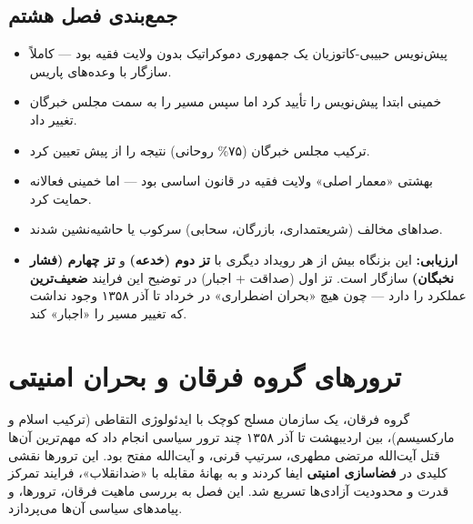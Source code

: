 \documentclass[12pt,a4paper]{book}
\newcommand{\keyword}[1]{\textbf{\textcolor{cPrimary}{#1}}}
\begin{document}
\section{جمع‌بندی فصل هشتم}

\begin{principleBox}
\begin{itemize}[label=\textcolor{cPrimary}{$\blacksquare$}, rightmargin=2em]
    \item پیش‌نویس حبیبی-کاتوزیان یک جمهوری دموکراتیک بدون ولایت فقیه بود — کاملاً سازگار با وعده‌های پاریس.
    \item خمینی ابتدا پیش‌نویس را تأیید کرد اما سپس مسیر را به سمت مجلس خبرگان تغییر داد.
    \item ترکیب مجلس خبرگان (۷۵\% روحانی) نتیجه را از پیش تعیین کرد.
    \item بهشتی «معمار اصلی» ولایت فقیه در قانون اساسی بود — اما خمینی فعالانه حمایت کرد.
    \item صداهای مخالف (شریعتمداری، بازرگان، سحابی) سرکوب یا حاشیه‌نشین شدند.
    \item \keyword{ارزیابی:} این بزنگاه بیش از هر رویداد دیگری با \keyword{تز دوم (خدعه)} و \keyword{تز چهارم (فشار نخبگان)} سازگار است. تز اول (صداقت + اجبار) در توضیح این فرایند \keyword{ضعیف‌ترین} عملکرد را دارد — چون هیچ «بحران اضطراری» در خرداد تا آذر ۱۳۵۸ وجود نداشت که تغییر مسیر را «اجبار» کند.
\end{itemize}
\end{principleBox}


\chapter{ترورهای گروه فرقان و بحران امنیتی}

\begin{infoBox}
گروه فرقان، یک سازمان مسلح کوچک با ایدئولوژی التقاطی (ترکیب اسلام و مارکسیسم)، بین اردیبهشت تا آذر ۱۳۵۸ چند ترور سیاسی انجام داد که مهم‌ترین آن‌ها قتل آیت‌الله مرتضی مطهری، سرتیپ قرنی، و آیت‌الله مفتح بود. این ترورها نقشی کلیدی در \keyword{فضاسازی امنیتی} ایفا کردند و به بهانهٔ مقابله با «ضدانقلاب»، فرایند تمرکز قدرت و محدودیت آزادی‌ها تسریع شد. این فصل به بررسی ماهیت فرقان، ترورها، و پیامدهای سیاسی آن‌ها می‌پردازد.
\end{infoBox}
\end{document}
